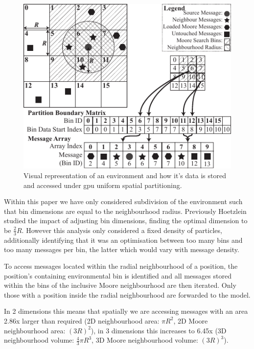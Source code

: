 \begin{figure}[!t]
\centering
\includegraphics[width=\linewidth]{../resources/usp/usp.pdf}
\caption{\label{fig:uniform-spatial-partitioning}%
Visual representation of an environment and how it's data is stored and accessed under \gls{gpu} uniform spatial partitioning.
}
\end{figure}

Within this paper we have only considered subdivision of the environment such that bin dimensions are equal to the neighbourhood radius. Previously Hoetzlein studied the impact of adjusting bin dimensions, finding the optimal dimension to be $\frac{2}{3}R$\cite{Hoe14}. However this analysis only considered a fixed density of particles, additionally identifying that it was an optimisation between too many bins and too many messages per bin, the latter which would vary with message density.

To access messages located within the radial neighbourhood of a position, the position's containing environmental bin is identified and all messages stored within the bins of the inclusive Moore neighbourhood are then iterated. Only those with a position inside the radial neighbourhood are forwarded to the model.

In 2 dimensions this means that spatially we are accessing messages with an area 2.86x larger than required (2D neighbourhood area: $\pi R^{2}$, 2D Moore neighbourhood area: $(3R)^{2}$), in 3 dimensions this increases to 6.45x (3D neighbourhood volume: $\frac{4}{3}\pi R^{3}$, 3D Moore neighbourhood volume: $(3R)^{3}$).

